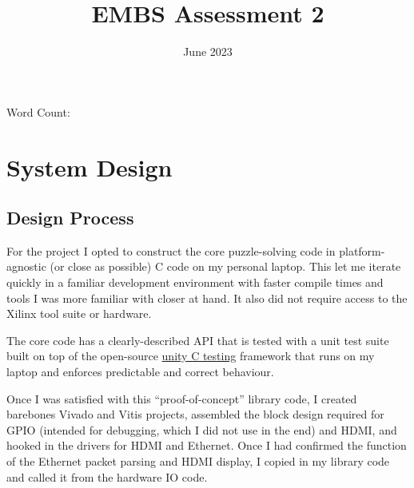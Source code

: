 \documentclass[11pt]{article}
\title{EMBS Assessment 2}
\author{}
\date{June 2023}
\begin{document}
\begin{titlepage}
\maketitle
Word Count: 
\tableofcontents
\end{titlepage}

\section{System Design}

\subsection{Design Process}


For the project I opted to construct the core puzzle-solving code in platform-agnostic (or close as possible) C code on my personal laptop.
This let me iterate quickly in a familiar development environment with faster compile times and tools I was more familiar with closer at hand.
It also did not require access to the Xilinx tool suite or hardware.

The core code has a clearly-described API that is tested with a unit test suite built on top of the open-source \href{https://github.com/ThrowTheSwitch/Unity}{unity C testing} framework that runs on my laptop and enforces predictable and correct behaviour.



Once I was satisfied with this ``proof-of-concept'' library code, I created barebones Vivado and Vitis projects, assembled the block design required for GPIO (intended for debugging, which I did not use in the end) and HDMI, and hooked in the drivers for HDMI and Ethernet.
Once I had confirmed the function of the Ethernet packet parsing and HDMI display, I copied in my library code and called it from the hardware IO code.
\end{document}

